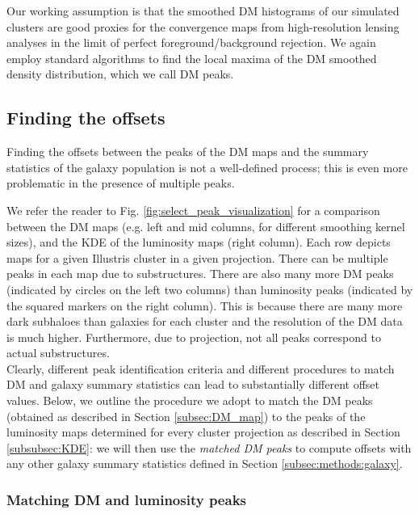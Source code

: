 \documentclass[usenatbib]{mn2e}
\newcommand{\ap}[1]{\textcolor{cyan}{#1}}
\begin{document}
{Our working assumption is that the smoothed DM histograms of our simulated clusters 
are good proxies for the convergence maps from high-resolution lensing analyses in the limit of perfect foreground/background rejection. We again employ standard algorithms to find the local maxima of the DM smoothed density distribution, which we call DM peaks. 


\subsection{Finding the offsets} \label{subsec:offsets}
Finding the offsets between the peaks of the DM maps and the summary statistics of the 
galaxy population is not a well-defined process; this is even more problematic in the presence of multiple peaks.

We refer the reader to Fig. \ref{fig:select_peak_visualization} for a comparison
between the DM maps (e.g. left and mid columns, for different smoothing kernel sizes), and 
the KDE of the luminosity maps (right column).
Each row depicts maps for a given Illustris cluster in a given projection.
There can be multiple peaks in each map due to substructures. 
There are also many more DM peaks (indicated by circles on the left two columns) 
than luminosity peaks (indicated by the squared markers on the right column).
This is because there are many more dark subhaloes than galaxies for each cluster and 
the resolution of the DM data is much higher. 
Furthermore, due to projection, not all peaks correspond to actual substructures.\\

Clearly, different peak identification criteria and different procedures to match DM and galaxy summary statistics can lead to substantially different offset values. 
Below, we outline the procedure we adopt to match the DM peaks (obtained as described in Section \ref{subsec:DM_map}) to the peaks of the luminosity maps determined for every cluster projection as described in Section \ref{subsubsec:KDE}: we will then use the {\it matched DM peaks} to compute offsets with any other galaxy summary statistics defined in Section \ref{subsec:methods:galaxy}.


\subsubsection{Matching DM and luminosity peaks}

}
\end{document}
